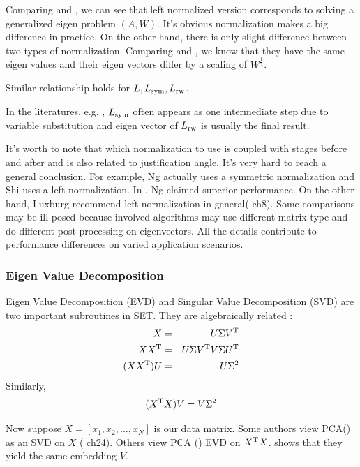 Comparing \req{\ref{eq:eiga}} and \req{\ref{eq:eigarw1}}, we can see that 
left normalized version corresponds to solving a generalized eigen
problem $ (A, W) $. It's obvious normalization makes a big difference 
in practice. On the other hand, there is only slight difference 
between two types of normalization. 
Comparing \req{\ref{eq:eigarw2}} and \req{\ref{eq:eigasym}}, 
we know that they have the same eigen values and their eigen vectors
differ by a scaling of $ W^{\frac{1}{2}} $. 

Similar relationship holds for $ L, L_{\text{sym}}, L_{\text{rw}} $. 

In the literatures, e.g. \cite{belkin2003laplacian}
\cite{shi2000normalized}, $ L_{\text{sym}} $ often appears as 
one intermediate step due to variable substitution and 
eigen vector of $ L_{\text{rw}} $ is usually the final result. 

It's worth to note that which normalization to use is 
coupled with stages before and after
and is also related to justification angle. It's very hard to 
reach a general conclusion. For example, Ng\cite{ng2002spectral}
actually uses a symmetric normalization and Shi\cite{shi2000normalized}
uses a left normalization. In \cite{ng2002spectral}, Ng 
claimed superior performance. On the other hand, Luxburg
recommend left normalization in general(\cite{von2007tutorial} ch8). 
Some comparisons may be ill-posed because involved algorithms 
may use different matrix type and do different post-processing 
on eigenvectors. All the details contribute to performance 
differences on varied application scenarios. 

\subsubsection{Eigen Value Decomposition}

Eigen Value Decomposition (EVD) and Singular Value Decomposition (SVD)
are two important subroutines in SET. They are algebraically related
\cite{wki_svd}:
\begin{eqnarray}
	X &=& U \Sigma V^\mathrm{T} \\
	XX^\mathrm{T} &=& U \Sigma V^\mathrm{T} V \Sigma U^\mathrm{T} \\
	(XX^\mathrm{T}) U &=& U \Sigma^2 
\end{eqnarray}
Similarly, 
\begin{equation}
	(X^\mathrm{T}X) V = V \Sigma^2 
	\label{eq:svd_evd_rel}
\end{equation}

Now suppose $ X = [x_1, x_2, \ldots, x_N] $ is our data matrix. 
Some authors view PCA(\rsec{\ref{sec:pca}}) 
as an SVD on $ X $ (\cite{borg2005modern} ch24). 
Others view PCA (\rsec{\ref{sec:pca}}) EVD on $ X^\mathrm{T}X $. 
\req{\ref{eq:svd_evd_rel}} shows that they yield the 
same embedding $ V $. 


